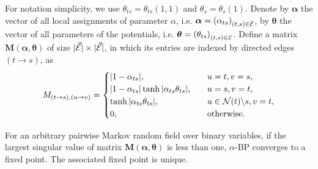 For notation simplicity, we use $\theta_{ts}=\theta_{ts}(1, 1)$ and $\theta_s = \theta_s(1)$. Denote by $\bm{\alpha}$ the vector of all local assignments of parameter $\alpha$, i.e. $\bm{\alpha} = \left(  \alpha_{ts} \right)_{(t ,s) \in \mathcal{E} }$, by $\bm{\theta}$ the vector of all parameters of the potentials, i.e. $\bm{\theta} = \left(  \theta_{ts} \right)_{(t ,s) \in \mathcal{E} }$.  Define a matrix $\bm{M}(\bm{\alpha}, \bm{\theta})$ of size $| \vec{\mathcal{E}} | \times | \vec{\mathcal{E}} |$, in which its entries are indexed by directed edges $(t\rightarrow s)$, as
\begin{align}\label{eq:matrix_m}
  M_{(t\rightarrow s), (u \rightarrow v)} =
  \begin{cases}
    |  1 - \alpha_{ts} |, &\quad u=t, v=s, \\
    |  1 - \alpha_{ts} | \tanh | \alpha_{ts} \theta_{ts} |, & \quad u = s, v =t, \\
    \tanh| \alpha_{ts} \theta_{ts} |, & \quad u \in \mathcal{N}(t)\backslash s, v = t, \\
    0, & \quad \mathrm{otherwise}.
  \end{cases}
\end{align}
\begin{theorem}\label{thm:normd}
  For an arbitrary pairwise Markov random field over binary variables,
  if the largest singular value of matrix $\bm{M}(\bm{\alpha}, \bm{\theta})$ is less than one,
  $\alpha$-BP converges to a fixed point. The associated fixed point is unique.
\end{theorem}

